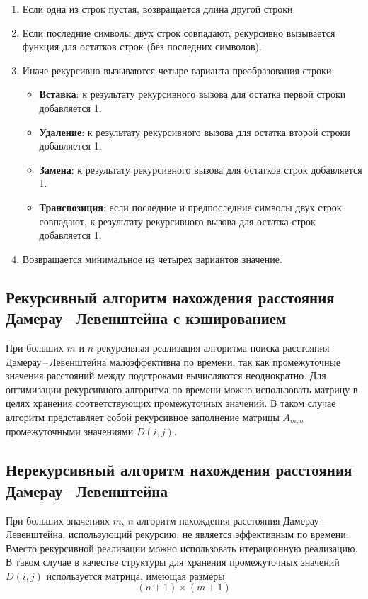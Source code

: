\begin{enumerate}
    \item Если одна из строк пустая, возвращается длина другой строки.
    \item Если последние символы двух строк совпадают, рекурсивно вызы\-вается функция для остатков строк (без последних символов).
    \item Иначе рекурсивно вызываются четыре варианта преобразования строки:
    \begin{itemize}
        \item \textbf{Вставка}: к результату рекурсивного вызова для остатка первой строки добавляется 1.
        \item \textbf{Удаление}: к результату рекурсивного вызова для остатка вто\-рой строки добавляется 1.
        \item \textbf{Замена}: к результату рекурсивного вызова для остатков строк добавляется 1.
        \item \textbf{Транспозиция}: если последние и предпоследние символы двух строк совпадают, к результату рекурсивного вызова для остатка строк добавляется 1.
    \end{itemize}
    \item Возвращается минимальное из четырех вариантов значение.
\end{enumerate}


\subsection{\texorpdfstring{Рекурсивный алгоритм нахождения рассто\-яния Дамерау\,--\,Левенштейна с кэшировани\-ем}{}}

При больших $m$ и $n$ рекурсивная реализация алгоритма поиска расстояния Дамерау\,--\,Левенштейна малоэффективна по времени, так как промежуточные значения расстояний между подстроками вычисляются неоднократно. Для оптимизации рекурсивного алгоритма по времени можно использовать матрицу в целях хранения соответствующих про\-межуточных значений. В таком случае алгоритм представляет собой рекурсивное заполнение матрицы $A_{m,n}$ промежуточными значениями $D(i, j)$.

\subsection{\texorpdfstring{Нерекурсивный алгоритм нахождения рас\-стояния Дамерау\,--\,Левенштейна}{}}

При больших значениях $m$, $n$ алгоритм нахождения расстояния Дамерау\,--\,Левенштейна, использующий рекурсию, не является эффективным по времени. Вместо рекурсивной реализации можно использовать итерационную реализацию. В таком случае в качестве структуры для хранения промежуточных значений $D(i, j)$ используется матрица, имеющая размеры 
\begin{equation}
    (n + 1) \times (m + 1)
\end{equation}

